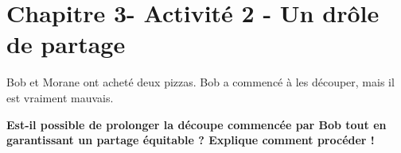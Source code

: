 \section*{Chapitre 3- Activité 2 - Un drôle de partage}


Bob et Morane ont acheté deux pizzas.
Bob a commencé à les découper, mais il est vraiment mauvais.

\textbf{Est-il possible de prolonger la découpe commencée par Bob tout en garantissant un partage équitable ? Explique comment procéder !}

\begin{minipage}[t]{0.5\textwidth}
    \begin{figure}[H]
        \centering
    \end{figure}
\end{minipage}
\hfill
\begin{minipage}[t]{0.5\textwidth}
    \begin{figure}[H]
        \centering
    \end{figure}
\end{minipage}
